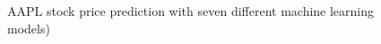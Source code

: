 \documentclass[conference]{IEEEtran}
\begin{document}
\begin{figure}
	\caption{AAPL stock price prediction with seven different machine learning models)}
	\label{figure:AAPL_RMSE_prediction}
\end{figure}
\end{document}
